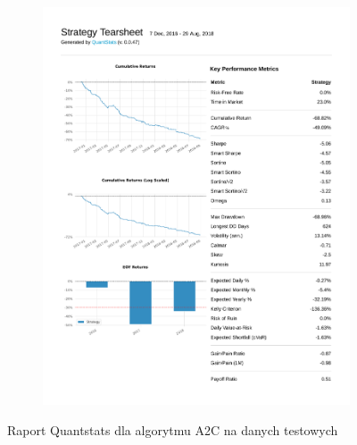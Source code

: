\documentclass[12pt,a4paper]{article}
\begin{document}
\begin{figure}[ht!]
\begin{subfigure}[ht!]{0.45\textwidth}
    \includegraphics[page=3, width=\textwidth]{plots/qs_a2c.pdf}
  \end{subfigure}
  \caption{Raport Quantstats dla algorytmu A2C na
    danych testowych}
\end{figure}
\end{document}
